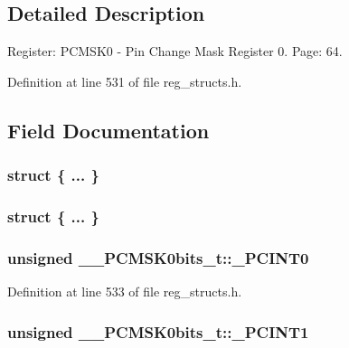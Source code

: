 \subsection{Detailed Description}
Register\+: P\+C\+M\+S\+K0 -\/ Pin Change Mask Register 0. Page\+: 64. 

Definition at line 531 of file reg\+\_\+structs.\+h.



\subsection{Field Documentation}
\hypertarget{union_____p_c_m_s_k0bits__t_a9b420d465074774619c19409712abf84}{\subsubsection[{"@129}]{\setlength{\rightskip}{0pt plus 5cm}struct \{ ... \} }}\label{union_____p_c_m_s_k0bits__t_a9b420d465074774619c19409712abf84}
\hypertarget{union_____p_c_m_s_k0bits__t_a2190534c14cf3911a67cbf4d64e05bb7}{\subsubsection[{"@131}]{\setlength{\rightskip}{0pt plus 5cm}struct \{ ... \} }}\label{union_____p_c_m_s_k0bits__t_a2190534c14cf3911a67cbf4d64e05bb7}
\hypertarget{union_____p_c_m_s_k0bits__t_a4c36533599743b77040f39aa26565e9c}{
\subsubsection[{\+\_\+\+P\+C\+I\+N\+T0}]{\setlength{\rightskip}{0pt plus 5cm}unsigned \+\_\+\+\_\+\+P\+C\+M\+S\+K0bits\+\_\+t\+::\+\_\+\+P\+C\+I\+N\+T0}}\label{union_____p_c_m_s_k0bits__t_a4c36533599743b77040f39aa26565e9c}


Definition at line 533 of file reg\+\_\+structs.\+h.

\hypertarget{union_____p_c_m_s_k0bits__t_a9d2626d7fe2b7978ad946dfbeefbd3fe}{
\subsubsection[{\+\_\+\+P\+C\+I\+N\+T1}]{\setlength{\rightskip}{0pt plus 5cm}unsigned \+\_\+\+\_\+\+P\+C\+M\+S\+K0bits\+\_\+t\+::\+\_\+\+P\+C\+I\+N\+T1}}\label{union_____p_c_m_s_k0bits__t_a9d2626d7fe2b7978ad946dfbeefbd3fe}


